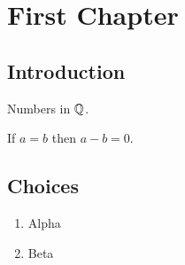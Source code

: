 \chapter{First Chapter}
\section{Introduction}
Numbers in $\mathbb{Q}$.
\begin{theorem}
If $a=b$ then $a-b=0$.
\end{theorem}
\section{Choices}
\begin{enumerate}
\item Alpha
\item Beta
\end{enumerate}

